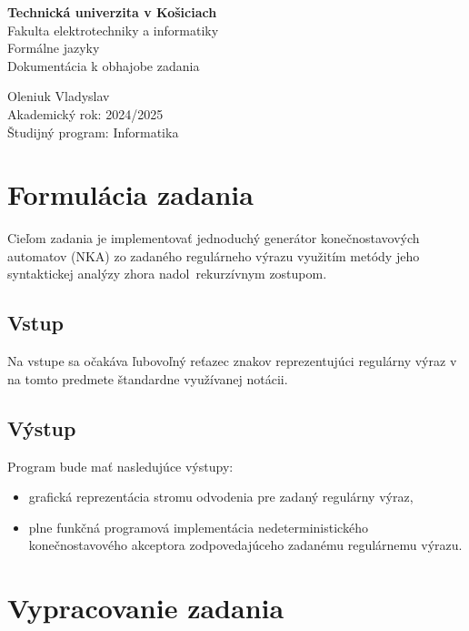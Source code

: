 \documentclass[a4paper,12pt]{article}
\begin{document}
\begin{titlepage}
    \centering
    \vspace*{1cm}
    \Large{\textbf{Technická univerzita v Košiciach}\\
    Fakulta elektrotechniky a informatiky}\\
    \vfill
    \large{Formálne jazyky}\\
    \large{Dokumentácia k obhajobe zadania}
    \vfill
    \begin{flushleft}
        Oleniuk Vladyslav\\
        Akademický rok: 2024/2025\\
        Študijný program: Informatika
    \end{flushleft}
\end{titlepage}

\tableofcontents
\newpage

\section{Formulácia zadania}


Cieľom zadania je implementovať jednoduchý generátor konečnostavových automatov (NKA) zo zadaného regulárneho výrazu využitím metódy jeho syntaktickej analýzy zhora nadol rekurzívnym zostupom.

\subsection{Vstup}

Na vstupe sa očakáva ľubovoľný reťazec znakov reprezentujúci regulárny výraz v na tomto predmete štandardne využívanej notácii.

\subsection{Výstup}

Program bude mať nasledujúce výstupy:
\begin{itemize}
    \item grafická reprezentácia stromu odvodenia pre zadaný regulárny výraz,
    \item plne funkčná programová implementácia nedeterministického konečnostavového akceptora zodpovedajúceho zadanému regulárnemu výrazu.
\end{itemize}

\section{Vypracovanie zadania}
\end{document}
